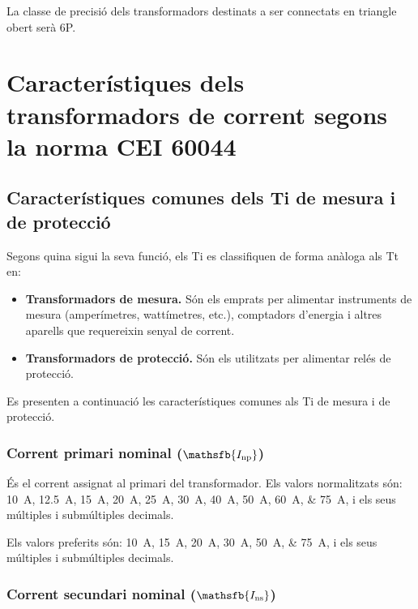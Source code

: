 La classe de precisió dels transformadors destinats a ser connectats en triangle obert serà 6P.

\section{Característiques dels transformadors de corrent segons la norma  CEI 60044}

\subsection{Característiques comunes dels Ti de mesura i de protecció}

Segons quina sigui la seva funció, els Ti es classifiquen de forma
anàloga als Tt en:
\begin{itemize}
	\item \textbf{Transformadors de mesura.} Són els emprats per alimentar
	instruments de mesura (amperímetres, wattímetres, etc.),
	comptadors d'energia i altres aparells que requereixin senyal de corrent.
	\item \textbf{Transformadors de protecció.} Són els utilitzats per
	alimentar relés de protecció.
\end{itemize}			

Es presenten a continuació les característiques comunes als Ti de
mesura i de protecció.


\subsubsection{Corrent primari nominal ($\mathsfb{I_\text{np}}$)}

 És el corrent assignat al
primari del transformador. Els valors normalitzats
són: \qtylist{10; 12,5; 15; 20; 25;30; 40; 50; 60;75}{A}, i els
seus múltiples i submúltiples decimals.

Els valors preferits són: \qtylist{10; 15; 20; 30; 50;75}{A}, i els
seus múltiples i submúltiples decimals.


\subsubsection{Corrent secundari nominal ($\mathsfb{I_\text{ns}}$)}

